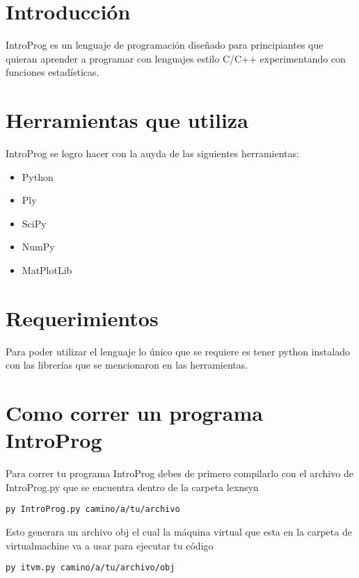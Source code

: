 \documentclass[
10pt, %
a4paper, %
oneside, %
headinclude,footinclude, %
BCOR5mm, %
]{scrartcl}
\begin{document}

\section{Introducción}

IntroProg es un lenguaje de programación diseñado para principiantes que quieran aprender a programar con lenguajes estilo C/C++ experimentando con funciones estadísticas.

\section{Herramientas que utiliza}
IntroProg se logro hacer con la auyda de las siguientes herramientas:
\begin{itemize}
\item Python
\item Ply
\item SciPy
\item NumPy
\item MatPlotLib
\end{itemize}
\section{Requerimientos}

Para poder utilizar el lenguaje lo único que se requiere es tener python instalado con las librerías que se mencionaron en las herramientas.

\section{Como correr un programa IntroProg}

Para correr tu programa IntroProg debes de primero compilarlo con el archivo de IntroProg.py que se encuentra dentro de la carpeta lexnsyn
\begin{lstlisting}
py IntroProg.py camino/a/tu/archivo
\end{lstlisting}

Esto generara un archivo obj el cual la máquina virtual que esta en la carpeta de virtualmachine va a usar para ejecutar tu código

\begin{lstlisting}
py itvm.py camino/a/tu/archivo/obj
\end{lstlisting}
\end{document}
